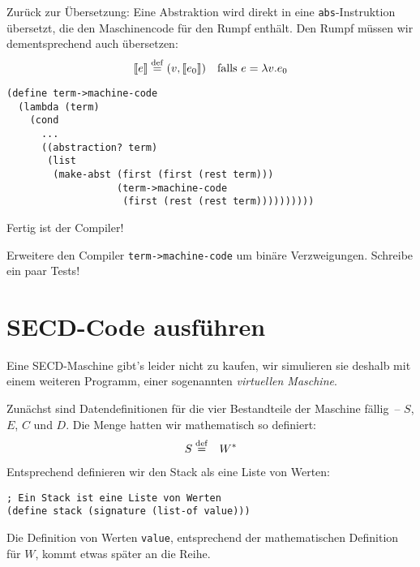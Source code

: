 %
Zurück zur Übersetzung: Eine Abstraktion wird direkt in eine
\lstinline{abs}-Instruktion übersetzt, die den Maschinencode für den
Rumpf enthält.  Den Rumpf müssen wir dementsprechend auch übersetzen:
\begin{displaymath}
  \llbracket e \rrbracket \stackrel{\rm def}{=}
    (v, \llbracket e_0\rrbracket) \quad \textrm{falls $e = \lambda v.e_0$}
\end{displaymath}
%
\begin{lstlisting}
(define term->machine-code
  (lambda (term)
    (cond
      ...
      ((abstraction? term)
       (list
        (make-abst (first (first (rest term)))
                   (term->machine-code
                    (first (rest (rest term))))))))))
\end{lstlisting}
%
Fertig ist der Compiler!

\begin{aufgabeinline}
  Erweitere den Compiler \lstinline{term->machine-code} um
  binäre Verzweigungen.  Schreibe ein paar Tests!
\end{aufgabeinline}

\section{SECD-Code ausführen}
\label{sec:secd-transition}

Eine SECD-Maschine gibt's leider nicht zu kaufen, wir simulieren sie
deshalb mit einem weiteren Programm, einer sogenannten
\textit{virtuellen Maschine}.

Zunächst sind Datendefinitionen für die vier Bestandteile der
Maschine fällig~-- $S$, $E$, $C$ und $D$.  Die Menge
hatten wir mathematisch so definiert:
%
\begin{eqnarray*}
    S &\stackrel{\rm def}{=}& W^\ast
\end{eqnarray*}
%
Entsprechend definieren wir den Stack als eine Liste von Werten:
%
\begin{lstlisting}
; Ein Stack ist eine Liste von Werten
(define stack (signature (list-of value)))
\end{lstlisting}
%
Die Definition von Werten \lstinline{value}, entsprechend der
mathematischen Definition für $W$, kommt etwas später an die Reihe.

